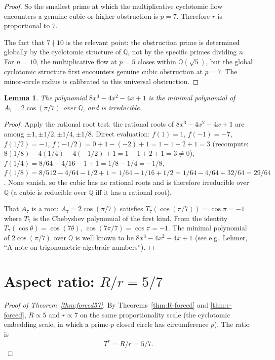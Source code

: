 \documentclass[11pt,reqno]{amsart}
\theoremstyle{plain}
\newtheorem{lemma}[theorem]{Lemma}
\theoremstyle{definition}
\newcommand{\Q}{\mathbb{Q}}
\newcommand{\Tstar}{T^{*}}
\begin{document}
\begin{proof}
So the smallest prime at which the multiplicative cyclotomic flow encounters a genuine cubic-or-higher obstruction is $p = 7$. Therefore $r$ is proportional to $7$.

The fact that $7 \nmid 10$ is the relevant point: the obstruction prime is determined globally by the cyclotomic structure of $\Q$, not by the specific primes dividing $n$. For $n = 10$, the multiplicative flow at $p = 5$ closes within $\Q(\sqrt 5)$, but the global cyclotomic structure first encounters genuine cubic obstruction at $p = 7$. The minor-circle radius is calibrated to this universal obstruction.
\end{proof}

\begin{lemma} \label{lem:A7-irreducible}
The polynomial $8 x^3 - 4 x^2 - 4 x + 1$ is the minimal polynomial of $A_7 = 2 \cos(\pi/7)$ over $\Q$, and is irreducible.
\end{lemma}

\begin{proof}
Apply the rational root test: the rational roots of $8 x^3 - 4 x^2 - 4 x + 1$ are among $\pm 1, \pm 1/2, \pm 1/4, \pm 1/8$. Direct evaluation: $f(1) = 1$, $f(-1) = -7$, $f(1/2) = -1$, $f(-1/2) = 0 + 1 - (-2) + 1 = 1 - 1 + 2 + 1 = 3$ (recompute: $8(1/8) - 4(1/4) - 4(-1/2) + 1 = 1 - 1 + 2 + 1 = 3 \neq 0$), $f(1/4) = 8/64 - 4/16 - 1 + 1 = 1/8 - 1/4 = -1/8$, $f(1/8) = 8/512 - 4/64 - 1/2 + 1 = 1/64 - 1/16 + 1/2 = 1/64 - 4/64 + 32/64 = 29/64$. None vanish, so the cubic has no rational roots and is therefore irreducible over $\Q$ (a cubic is reducible over $\Q$ iff it has a rational root).

That $A_7$ is a root: $A_7 = 2 \cos(\pi/7)$ satisfies $T_7(\cos(\pi/7)) = \cos \pi = -1$ where $T_7$ is the Chebyshev polynomial of the first kind. From the identity $T_7(\cos \theta) = \cos(7\theta)$, $\cos(7\pi/7) = \cos \pi = -1$. The minimal polynomial of $2 \cos(\pi/7)$ over $\Q$ is well known to be $8 x^3 - 4 x^2 - 4 x + 1$ (see e.g.\ Lehmer, ``A note on trigonometric algebraic numbers'').
\end{proof}

\section{Aspect ratio: $R/r = 5/7$}

\begin{proof}[Proof of Theorem~\ref{thm:forced57}]
By Theorems~\ref{thm:R-forced} and \ref{thm:r-forced}, $R \propto 5$ and $r \propto 7$ on the same proportionality scale (the cyclotomic embedding scale, in which a prime-$p$ closed circle has circumference $p$). The ratio is
\[
\Tstar = R/r = 5/7.
\]
\end{proof}
\end{document}
